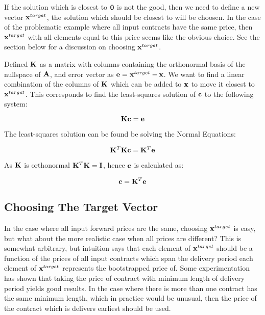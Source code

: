 \documentclass{article}
\begin{document}
\bigskip

If the solution which is closest to $\mathbf{0}$ is not the good, then we need to define
a new vector $\mathbf{x}^{target}$, the solution which should be closest to will be choosen.
In the case of the problematic example where all input contracts have the same price,
then $\mathbf{x}^{target}$ with all elements equal to this price seems like the obvious choice.
See the section below for a discussion on choosing $\mathbf{x}^{target}$.

\bigskip

Defined $\mathbf{K}$ as a matrix with columns containing the orthonormal basis of the nullspace
of $\mathbf{A}$, and error vector as $\mathbf{e} = \mathbf{x}^{target} - \mathbf{x}$. We want to find a linear combination
of the columns of $\mathbf{K}$ which can be added to $\mathbf{x}$ to move it closest to $\mathbf{x}^{target}$.
This corresponds to find the least-squares solution of $\mathbf{c}$ to the following system:

\begin{equation}
    \mathbf{K}\mathbf{c} = \mathbf{e}
\end{equation}

The least-squares solution can be found be solving the Normal Equations:

\begin{equation}
    \mathbf{K}^T \mathbf{K} \mathbf{c} = \mathbf{K}^T \mathbf{e}
\end{equation}

As $\mathbf{K}$ is orthonormal $\mathbf{K}^T \mathbf{K} = \mathbf{I}$, hence $\mathbf{c}$ is calculated as:

\begin{equation}
    \mathbf{c} = \mathbf{K}^T \mathbf{e}
\end{equation}


\subsection{Choosing The Target Vector}
In the case where all input forward prices are the same, choosing $\mathbf{x}^{target}$ is
easy, but what about the more realistic case when all prices are different? This is
somewhat arbitrary, but intuition says that each element of $\mathbf{x}^{target}$ should be
a function of the prices of all input contracts which span the delivery period 
each element of $\mathbf{x}^{target}$ represents the bootstrapped price of. Some experimentation
has shown that taking the price of contract with minimum length of delivery period yields
good results. In the case where there is more than one contract has the same minimum length,
which in practice would be unusual, then the price of the contract which is delivers earliest 
should be used.
\end{document}
